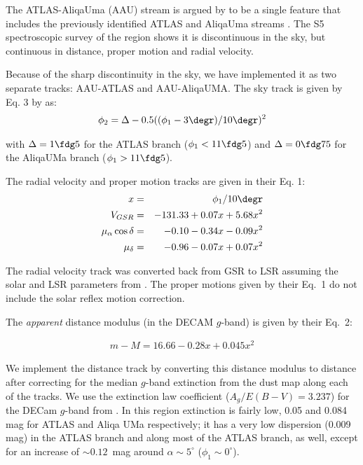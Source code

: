 The ATLAS-AliqaUma (AAU) stream is argued by \citet{Li2021} to be a single feature that includes the previously
identified ATLAS \citep{Koposov2014} and AliqaUma streams \citep{Shipp2018}. The S5 spectroscopic survey of the region
shows it is discontinuous in the sky, but continuous in distance, proper motion and radial velocity.

Because of the sharp discontinuity in the sky, we have implemented it as two separate tracks: AAU-ATLAS and AAU-AliqaUMA.
The sky track is given by Eq. 3 by \citet{Li2021} as:
\begin{eqnarray*}
\phi_2 = \Delta -0.5((\phi_1-3\degr)/10\degr)^2
\end{eqnarray*}

with $\Delta=1\fdg5$ for the ATLAS branch ($\phi_1<11\fdg5$) and $\Delta=0\fdg75$ for the AliqaUMa branch ($\phi_1>11\fdg5$).

The radial velocity and proper motion tracks are given in their Eq. 1:
\begin{eqnarray*}
x &=& \phi_1/10\degr \\
V_{GSR} &=& -131.33 + 0.07x + 5.68x^2 \\
\mu_\alpha\cos{\delta} &=& -0.10-0.34x-0.09x^2 \\
\mu_\delta &=& -0.96 -0.07x +0.07x^2
\end{eqnarray*}

The radial velocity track was converted back from GSR to LSR assuming the solar and LSR parameters 
from \citet{Schoenrich2010}. The proper motions given by their Eq.~1 do not include the solar reflex motion correction.

The \emph{apparent} distance modulus (in the DECAM $g$-band) is given by their Eq.~2:

\begin{eqnarray*}
m-M = 16.66 -0.28x + 0.045x^2 
\end{eqnarray*}

We implement the distance track by converting this distance modulus to distance after correcting for the median $g$-band extinction from the \citet{SFD98} dust map along each of the tracks. We use the extinction law coefficient ($A_g/E(B-V)=3.237$) for the DECam $g$-band from \citet{SF11}. In this region extinction is fairly low, 0.05 and 0.084 mag for ATLAS and Aliqa UMa respectively; it has a very low dispersion (0.009 mag) in the ATLAS branch and along most of the ATLAS branch, as well, except for an increase of $\sim0.12$~mag around $\alpha\sim5^\circ$ ($\phi_1\sim0^\circ$).

